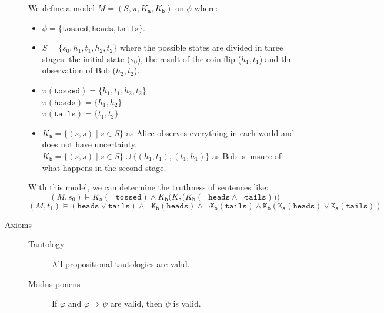 \begin{description}
\begin{example}
            We define a model $M = (S, \pi, K_\texttt{a}, K_\texttt{b})$ on $\phi$ where:
            \begin{itemize}
                \item $\phi = \{ \texttt{tossed}, \texttt{heads}, \texttt{tails} \}$.
                \item $S = \{ s_0, h_1, t_1, h_2, t_2 \}$ where the possible states are divided in three stages:
                    the initial state ($s_0$), the result of the coin flip ($h_1, t_1$) and the observation of Bob ($h_2, t_2$).
                \item 
                    $\pi(\texttt{tossed}) = \{ h_1, t_1, h_2, t_2 \}$\\
                    $\pi(\texttt{heads}) = \{ h_1, h_2 \}$\\
                    $\pi(\texttt{tails}) = \{ t_1, t_2 \}$
                \item 
                    $K_\texttt{a} = \{ (s, s) \mid s \in S \}$ as Alice observes everything in each world and does not have uncertainty.\\
                    $K_\texttt{b} = \{ (s, s) \mid s \in S \} \cup \{ (h_1, t_1), (t_1, h_1) \}$ as Bob is unsure of what happens in the second stage.\\
            \end{itemize}
            \vspace*{-1em}
            With this model, we can determine the truthness of sentences like:
            \[ (M, s_0) \models K_\texttt{a}(\lnot\texttt{tossed}) \land K_\texttt{b}\Big(K_\texttt{a}\big(K_\texttt{b}(\lnot \texttt{heads} \land \lnot \texttt{tails})\big)\Big) \]
            \[ (M, t_1) \models (\texttt{heads} \vee \texttt{tails}) \land \lnot\texttt{K}_\texttt{b}(\texttt{heads}) \land 
                \lnot\texttt{K}_\texttt{b}(\texttt{tails}) \land 
                \texttt{K}_\texttt{b}(\texttt{K}_\texttt{a}(\texttt{heads}) \vee \texttt{K}_\texttt{a}(\texttt{tails})) \]
        \end{example}
    
    \item[Axioms] \phantom{}
        \begin{description}
            \item[Tautology] 
                All propositional tautologies are valid.

            \item[Modus ponens] 
                If $\varphi$ and $\varphi \Rightarrow \psi$ are valid, then $\psi$ is valid.


\end{description}
\end{description}
